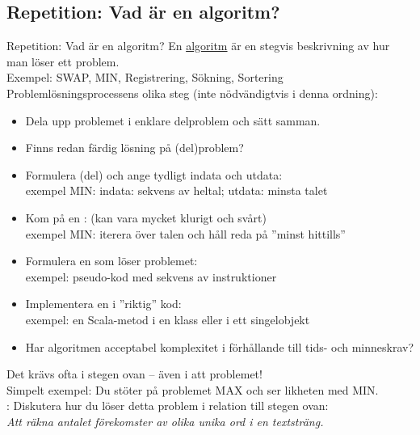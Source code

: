 


\subsection{Repetition: Vad är en algoritm?}
\begin{Slide}{Repetition: Vad är en algoritm? }\SlideFontTiny
\pause En \href{https://sv.wikipedia.org/wiki/Algoritm}{algoritm} är en stegvis beskrivning av hur man löser ett problem. \\ 
Exempel: SWAP, MIN, Registrering, Sökning, Sortering \\
\pause\vspace{0.5em}
Problemlösningsprocessens olika steg (inte nödvändigtvis i denna ordning): 
\begin{itemize}
\item Dela upp problemet i enklare delproblem och sätt samman.
\item Finns redan färdig lösning på (del)problem?
\item Formulera (del) och ange tydligt indata och utdata: \\ exempel MIN: indata: sekvens av heltal; utdata: minsta talet
\item Kom på en : (kan  vara mycket klurigt och svårt) \\ exempel MIN: iterera över talen och håll reda på ''minst hittills''
\item Formulera en  som löser problemet: \\ exempel: pseudo-kod med sekvens av instruktioner
\item Implementera en  i ''riktig'' kod: \\ exempel: en Scala-metod i en klass eller i ett singelobjekt
\item Har algoritmen acceptabel komplexitet i förhållande till tids- och minneskrav?
\end{itemize}
\pause Det krävs ofta  i stegen ovan  -- även i att  problemet!\\
Simpelt exempel: Du stöter på problemet MAX och ser likheten med MIN.\\
\pause\vspace{0.5em}: Diskutera hur du löser detta problem i relation till stegen ovan: \\
\emph{Att räkna antalet förekomster av olika unika ord i en textsträng.} 
\end{Slide}












